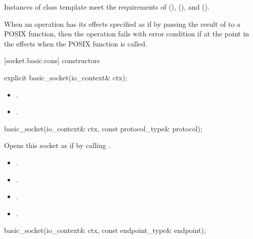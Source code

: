 \pnum
Instances of class template  meet the requirements of  (),  (), and  ().

\pnum
When an operation has its effects specified as if by passing the result of  to a POSIX function, then the operation fails with error condition  if  at the point in the effects when the POSIX function is called.


[socket.basic.cons]{ constructors}

\begin{itemdecl}
explicit basic_socket(io_context& ctx);
\end{itemdecl}

\begin{itemdescr}
\pnum
\postconditions 
\begin{itemize}
\item
{}.
\item
{}.
\end{itemize}
\end{itemdescr}

\begin{itemdecl}
basic_socket(io_context& ctx, const protocol_type& protocol);
\end{itemdecl}

\begin{itemdescr}
\pnum
\effects Opens this socket as if by calling .

\pnum
\postconditions 
\begin{itemize}
\item
{}.
\item
{}.
\item
{}.
\item
{}.
\end{itemize}
\end{itemdescr}

\begin{itemdecl}
basic_socket(io_context& ctx, const endpoint_type& endpoint);
\end{itemdecl}

